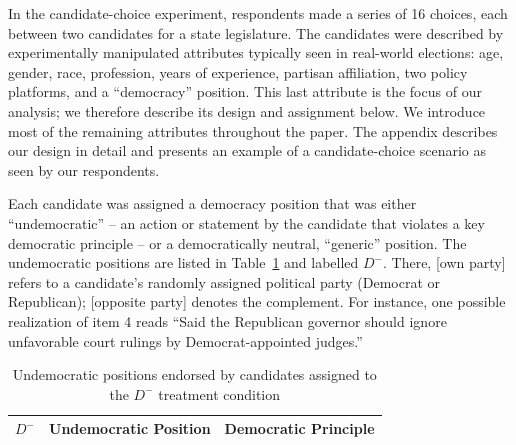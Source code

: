 \documentclass[letterpaper, 12pt]{article}
\begin{document}
\begin{raggedright}
In the candidate-choice experiment, respondents made a series of 16 choices, each between two candidates for a state legislature. The candidates were described by experimentally manipulated attributes typically seen in real-world elections: age, gender, race, profession, years of experience, partisan affiliation, two policy platforms, and a ``democracy'' position. This last attribute is the focus of our analysis; we therefore describe its design and assignment below. We introduce most of the remaining attributes throughout the paper. The appendix describes our design in detail and presents an example of a candidate-choice scenario as seen by our respondents.

Each candidate was assigned a democracy position that was either ``undemocratic'' -- an action or statement by the candidate that violates a key democratic principle -- or a democratically neutral, ``generic'' position. The undemocratic positions are listed in Table~\ref{tab: treatments} and labelled $D^-$. There, [own party] refers to a candidate's randomly assigned political party (Democrat or Republican); [opposite party] denotes the complement. For instance, one possible realization of item 4 reads ``Said the Republican governor should ignore unfavorable court rulings by Democrat-appointed judges.''

{
\def\sep{0.3em}
\def\ssep{-0.3em}
\def\fns{\footnotesize}
\def\onepc{$^{\ast\ast\ast}$} \def\fivepc{$^{\ast\ast}$}
\def\tenpc{$^{\ast}$}
\def\legend{\multicolumn{3}{l}{\footnotesize{Significance levels
:\hspace{1em} $\dag$ : 10\% \hspace{1em}
$\ast$ : 5\% \hspace{1em} $\ast\ast$ : 1\% \normalsize}}}

\begin{table}[t!]\centering
\caption{Undemocratic positions endorsed by candidates assigned to the $D^-$ treatment condition}
\label{tab: treatments}
\vspace{2mm}
\small
\begin{tabular}{l l l}

\toprule

\boldmath${D^-}$ & \textbf{Undemocratic Position} & \textbf{Democratic Principle} \\

\toprule


\end{tabular}
\end{table}}
\end{raggedright}
\end{document}
